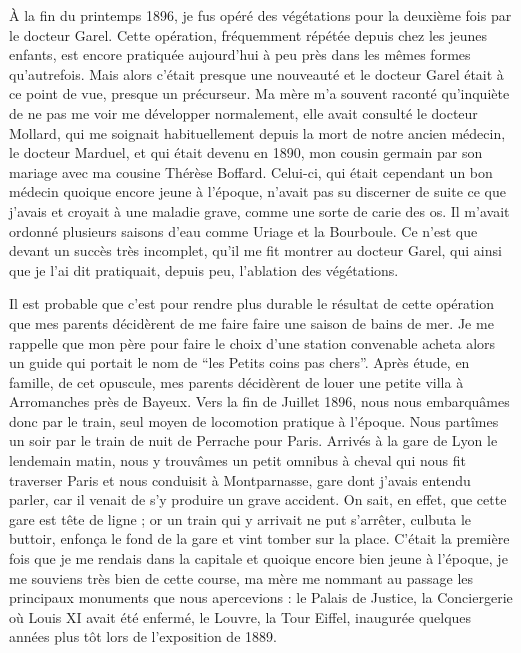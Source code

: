 \documentclass[11pt,a4paper]{report}
\begin{document}
À la fin du printemps 1896, je fus opéré des végétations pour la deuxième fois par le docteur Garel. Cette opération, fréquemment répétée depuis chez les jeunes enfants, est encore pratiquée aujourd'hui à peu près dans les mêmes formes qu'autrefois. Mais alors c'était presque une nouveauté et le docteur Garel était à ce point de vue, presque un précurseur. Ma mère m'a souvent raconté qu'inquiète de ne pas me voir me développer normalement, elle avait consulté le docteur Mollard, qui me soignait habituellement depuis la mort de notre ancien médecin, le docteur Marduel, et qui était devenu en 1890, mon cousin germain par son mariage avec ma cousine Thérèse Boffard. Celui-ci, qui était cependant un bon médecin quoique encore jeune à l'époque, n'avait pas su discerner de suite ce que j'avais et croyait à une maladie grave, comme une sorte de carie des os. Il m'avait ordonné plusieurs saisons d'eau comme Uriage et la Bourboule. Ce n'est que devant un succès très incomplet, qu'il me fit montrer au docteur Garel, qui ainsi que je l'ai dit pratiquait, depuis peu, l'ablation des végétations.

Il est probable que c'est pour rendre plus durable le résultat de cette opération que mes parents décidèrent de me faire faire une saison de bains de mer. Je me rappelle que mon père pour faire le choix d'une station convenable acheta alors un guide qui portait le nom de ``les Petits coins pas chers''. Après étude, en famille, de cet opuscule, mes parents décidèrent de louer une petite villa à Arromanches près de Bayeux. Vers la fin de Juillet 1896, nous nous embarquâmes donc par le train, seul moyen de locomotion pratique à l'époque. Nous partîmes un soir par le train de nuit de Perrache pour Paris. Arrivés à la gare de Lyon le lendemain matin, nous y trouvâmes un petit omnibus à cheval qui nous fit traverser Paris et nous conduisit à Montparnasse, gare dont j'avais entendu parler, car il venait de s'y produire un grave accident. On sait, en effet, que cette gare est tête de ligne ; or un train qui y arrivait ne put s'arrêter, culbuta le buttoir, enfonça le fond de la gare et vint tomber sur la place. C'était la première fois que je me rendais dans la capitale et quoique encore bien jeune à l'époque, je me souviens très bien de cette course, ma mère me nommant au passage les principaux monuments que nous apercevions : le Palais de Justice, la Conciergerie où Louis XI avait été enfermé, le Louvre, la Tour Eiffel, inaugurée quelques années plus tôt lors de l'exposition de 1889.
\end{document}
